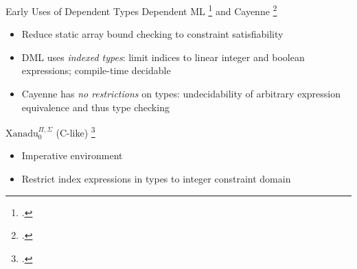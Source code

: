 \documentclass[aspectratio=169]{beamer}
\begin{document}
\begin{frame}{Early Uses of Dependent Types}
\vspace{-0.08in}
Dependent ML \footcite{xi_eliminating_1998} and Cayenne \footcite{augustsson_cayennelanguage_1998}
\begin{itemize}
    \item Reduce static array bound checking to constraint satisfiability
    \item DML uses \emph{indexed types}: limit indices to linear integer and boolean expressions; compile-time decidable 
    \item Cayenne has \emph{no restrictions} on types: undecidability of arbitrary expression equivalence and thus type checking 
\end{itemize}
$\text{Xanadu}_{0}^{\Pi,\Sigma}$ (C-like) \footcite{xi_imperative_2000}
\begin{itemize}
    \item Imperative environment
    \item Restrict index expressions in types to integer constraint domain 
\end{itemize}
    \vspace{0.2in}
\end{frame}

\end{document}
